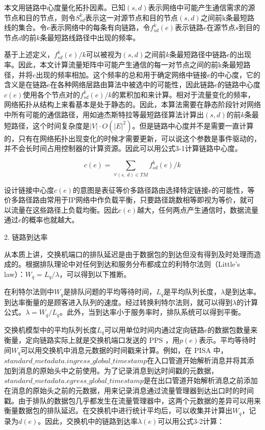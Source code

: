 本文用链路中心度量化拓扑因素。已知$(s,d)$表示网络中可能产生通信需求的源节点和目的节点，则令$S_{sd}^k$表示这一对源节点和目的节点$(s,d)$之间前k条最短路线的集合。令$e$表示网络中的每条有向链路，令$f_{sd}^k(e)$表示链路$e$在源节点$s$到目的节点$d$的前$k$条最短路线路径中出现的频率。

基于上述定义，$f_{sd}^k(e)/k$可以被视为$(s,d)$之间前$k$条最短路径中链路$e$的出现率。因此，本文计算流量矩阵中可能产生通信的每一对节点之间的前k条最短路径，并将$e$出现的频率相加。这个频率的总和用于确定网络中链接$e$的中心度，它的含义是在链路$e$在各种网络层路由算法中被选中的可能性，因此链路$e$的链路中心度$c(e)$使用各个节点对的$f_{sd}^k(e)/k$的累积加和来计算。相对于流量变化的频率，网络拓扑从结构上来看基本是处于静态的。因此，本算法需要在静态阶段针对网络中所有可能的通信路径，用如迪杰斯特拉等最短路径算法计算出$(s,d)$的前$k$条最短路径，这个时间复杂度是$|V|\cdot O({|E|}^2)$。但是链路中心度并不是需要一直计算的，只有在网络拓扑出现变化的时候才需要更新，可以说这个参数是事件驱动的，并不会长时间占用控制器的计算资源。因此可以用公式3-1计算链路中心度。

\begin{equation} \label{link centrality}
    c\left(e\right)=\sum_{\forall(s,\ d)\in T M}{f_{sd}^k\left(e\right)}/k
\end{equation}

设计链接中心度$c(e)$的意图是表征等价多路径路由选择特定链接$e$的可能性，等价多路径路由常用于IP网络中作负载平衡，只要路径跳数相等即视为等价，就可以流量在这些路径上负载均衡。因此$c(e)$越大，任何两点产生通信时，数据流量通过$e$的概率也就越大。

2. 链路到达率

从本质上讲，交换机端口的排队延迟是由于数据包的到达但没有得到及时处理而造成的。根据排队理论中对任何到达和服务分布都成立的利特尔法则（Little's law）：$W_q=L_q/\lambda$，可以得到以下推断。

在利特尔法则中$W_q$是排队问题的平均等待时间，$L_q$是平均队列长度，$\lambda$是到达率。到达率衡量的是顾客进入队列的速度。经过转换利特尔法则，就可以得到$\lambda$的计算公式。$\lambda=W_q/L_q$。此外，当到达率小于服务率时，排队系统可以得到平衡。

交换机模型中的平均队列长度$L_q$可以用单位时间内通过定向链路$e$的数据包数量来衡量，定向链路实际上就是交换机端口发送的 \gls*{PPS} ，用$p(e)$表示。平均等待时间$W_q$可以用交换机中消息元数据的时间戳来计算。例如，在 \gls*{PISA} 中，$standard\_metadata.ingress\_global\_timestamp$在入口管道开始解析消息并将其添加到消息的原始头中之前使用。为了记录消息到达时间戳的元数据，$standard\_metadata.egress\_global\_timestamp$是在出口管道开始解析消息之前添加在消息的原始头之前的元数据，用来记录消息通过流量管理器到达出口时的时间戳。由于排队的数据包几乎都发生在流量管理器中，这两个元数据的差异可以用来衡量数据包的排队延迟。在交换机中进行统计平均后，可以收集并计算出$W_q$，记录为$d(e)$。因此，交换机中的链路到达率$\lambda(e)$可以用公式3-2计算：

